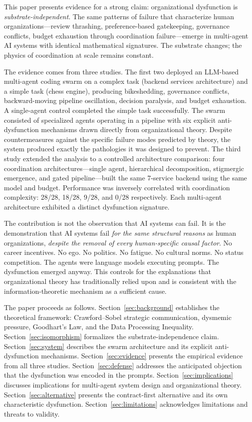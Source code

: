 \documentclass[11pt,a4paper]{article}
\begin{document}
This paper presents evidence for a strong claim: organizational dysfunction is \emph{substrate-independent}. The same patterns of failure that characterize human organizations---review thrashing, preference-based gatekeeping, governance conflicts, budget exhaustion through coordination failure---emerge in multi-agent AI systems with identical mathematical signatures. The substrate changes; the physics of coordination at scale remains constant.

The evidence comes from three studies. The first two deployed an LLM-based multi-agent coding swarm on a complex task (backend services architecture) and a simple task (chess engine), producing bikeshedding, governance conflicts, backward-moving pipeline oscillation, decision paralysis, and budget exhaustion. A single-agent control completed the simple task successfully. The swarm consisted of specialized agents operating in a pipeline with six explicit anti-dysfunction mechanisms drawn directly from organizational theory. Despite countermeasures against the specific failure modes predicted by theory, the system produced exactly the pathologies it was designed to prevent. The third study extended the analysis to a controlled architecture comparison: four coordination architectures---single agent, hierarchical decomposition, stigmergic emergence, and gated pipeline---built the same 7-service backend using the same model and budget. Performance was inversely correlated with coordination complexity: 28/28, 18/28, 9/28, and 0/28 respectively. Each multi-agent architecture exhibited a distinct dysfunction signature.

The contribution is not the observation that AI systems can fail. It is the demonstration that AI systems fail \emph{for the same structural reasons} as human organizations, \emph{despite the removal of every human-specific causal factor}. No career incentives. No ego. No politics. No fatigue. No cultural norms. No status competition. The agents were language models executing prompts. The dysfunction emerged anyway. This controls for the explanations that organizational theory has traditionally relied upon and is consistent with the information-theoretic mechanism as a sufficient cause.

The paper proceeds as follows. Section~\ref{sec:background} establishes the theoretical framework: Crawford--Sobel strategic communication, dysmemic pressure, Goodhart's Law, and the Data Processing Inequality. Section~\ref{sec:isomorphism} formalizes the substrate-independence claim. Section~\ref{sec:system} describes the swarm architecture and its explicit anti-dysfunction mechanisms. Section~\ref{sec:evidence} presents the empirical evidence from all three studies. Section~\ref{sec:defense} addresses the anticipated objection that the dysfunction was encoded in the prompts. Section~\ref{sec:implications} discusses implications for multi-agent system design and organizational theory. Section~\ref{sec:alternative} presents the contract-first alternative and its own characteristic dysfunction. Section~\ref{sec:limitations} acknowledges limitations and threats to validity.
\end{document}
